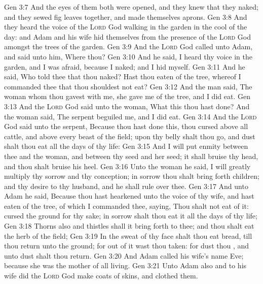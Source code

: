 \vs Gen 3:7 And the eyes of them both were opened, and they knew that they  naked; and they sewed fig leaves together, and made themselves aprons.
\vs Gen 3:8 And they heard the voice of the \textsc{Lord} God walking in the garden in the cool of the day: and Adam and his wife hid themselves from the presence of the \textsc{Lord} God amongst the trees of the garden.
\vs Gen 3:9 And the \textsc{Lord} God called unto Adam, and said unto him, Where  thou?
\vs Gen 3:10 And he said, I heard thy voice in the garden, and I was afraid, because I  naked; and I hid myself.
\vs Gen 3:11 And he said, Who told thee that thou  naked? Hast thou eaten of the tree, whereof I commanded thee that thou shouldest not eat?
\vs Gen 3:12 And the man said, The woman whom thou gavest  with me, she gave me of the tree, and I did eat.
\vs Gen 3:13 And the \textsc{Lord} God said unto the woman, What  this  thou hast done? And the woman said, The serpent beguiled me, and I did eat.
\vs Gen 3:14 And the \textsc{Lord} God said unto the serpent, Because thou hast done this, thou  cursed above all cattle, and above every beast of the field; upon thy belly shalt thou go, and dust shalt thou eat all the days of thy life:
\vs Gen 3:15 And I will put enmity between thee and the woman, and between thy seed and her seed; it shall bruise thy head, and thou shalt bruise his heel.
\vs Gen 3:16 Unto the woman he said, I will greatly multiply thy sorrow and thy conception; in sorrow thou shalt bring forth children; and thy desire  to thy husband, and he shall rule over thee.
\vs Gen 3:17 And unto Adam he said, Because thou hast hearkened unto the voice of thy wife, and hast eaten of the tree, of which I commanded thee, saying, Thou shalt not eat of it: cursed  the ground for thy sake; in sorrow shalt thou eat  it all the days of thy life;
\vs Gen 3:18 Thorns also and thistles shall it bring forth to thee; and thou shalt eat the herb of the field;
\vs Gen 3:19 In the sweat of thy face shalt thou eat bread, till thou return unto the ground; for out of it wast thou taken: for dust thou , and unto dust shalt thou return.
\vs Gen 3:20 And Adam called his wife's name Eve; because she was the mother of all living.
\vs Gen 3:21 Unto Adam also and to his wife did the \textsc{Lord} God make coats of skins, and clothed them.
